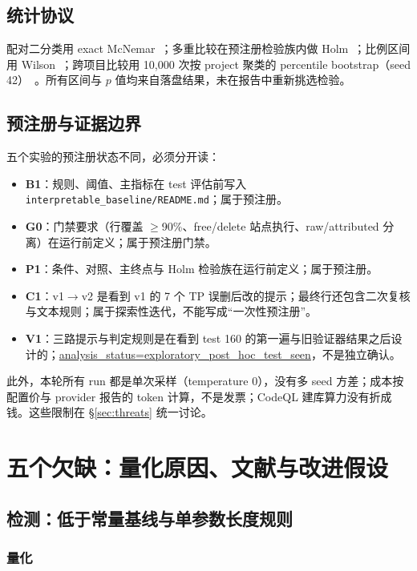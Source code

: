 \documentclass[conference]{IEEEtran}
\begin{document}
\subsection{统计协议}

配对二分类用 exact McNemar~\cite{mcnemar1947}；多重比较在预注册检验族内做 Holm~\cite{holm1979}；比例区间用 Wilson~\cite{wilson1927}；跨项目比较用 10{,}000 次按 project 聚类的 percentile bootstrap（seed 42）~\cite{efron1979}。所有区间与 $p$ 值均来自落盘结果，未在报告中重新挑选检验。

\subsection{预注册与证据边界}

五个实验的预注册状态不同，必须分开读：
\begin{itemize}
  \item \textbf{B1}：规则、阈值、主指标在 test 评估前写入 \texttt{interpretable\_baseline/README.md}；属于预注册。
  \item \textbf{G0}：门禁要求（行覆盖 $\ge$90\%、free/delete 站点执行、raw/attributed 分离）在运行前定义；属于预注册门禁。
  \item \textbf{P1}：条件、对照、主终点与 Holm 检验族在运行前定义；属于预注册。
  \item \textbf{C1}：v1$\to$v2 是看到 v1 的 7 个 TP 误删后改的提示；最终行还包含二次复核与文本规则；属于探索性迭代，不能写成“一次性预注册”。
  \item \textbf{V1}：三路提示与判定规则是在看到 test 160 的第一遍与旧验证器结果之后设计的；\url{analysis_status=exploratory_post_hoc_test_seen}，不是独立确认。
\end{itemize}

此外，本轮所有 run 都是单次采样（temperature 0），没有多 seed 方差；成本按配置价与 provider 报告的 token 计算，不是发票；CodeQL 建库算力没有折成钱。这些限制在 §\ref{sec:threats} 统一讨论。

\section{五个欠缺：量化原因、文献与改进假设}
\label{sec:gaps}

\subsection{检测：低于常量基线与单参数长度规则}
\label{sec:gap-detect}

\subsubsection{量化}
\end{document}
